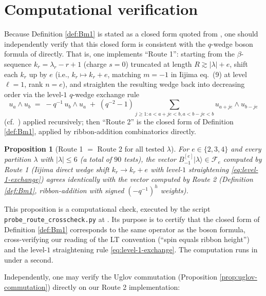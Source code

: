 \documentclass[11pt]{article}
\newtheorem{proposition}[theorem]{Proposition}
\theoremstyle{definition}
\newcommand{\Fock}{\mathcal{F}}
\newcommand{\Bmi}{B_{-1}^{[e]}}
\begin{document}
\section{Computational verification}
\label{sec:route-cross-check}

Because Definition \ref{def:Bm1} is stated as a closed form quoted from
\cite{LT96, Iij12}, one should independently verify that this closed form is
consistent with the $q$-wedge boson formula of \cite[eq.\ (9)]{Iij12} directly.
That is, one implements ``Route 1'': starting from the $\beta$-sequence
$k_r = \lambda_r - r + 1$ (charge $s = 0$) truncated at length
$R \gtrsim |\lambda| + e$, shift each $k_r$ up by $e$ (i.e., $k_r \mapsto k_r + e$,
matching $m = -1$ in Iijima eq.\ (9) at level $\ell = 1$, rank $n = e$), and
straighten the resulting wedge back into decreasing order via the level-$1$
$q$-wedge exchange rule
\begin{equation}
    u_a \wedge u_b \;=\; -q^{-1} \, u_b \wedge u_a \;+\; (q^{-2} - 1) \sum_{j \ge 1: a < a + j e < b, a < b - j e < b} u_{a + j e} \wedge u_{b - j e}
    \label{eq:level-1-exchange}
\end{equation}
(cf.\ \cite[Ex.\ 2.5, last line]{Iij12}) applied recursively; then ``Route 2''
is the closed form of Definition \ref{def:Bm1}, applied by ribbon-addition
combinatorics directly.

\begin{proposition}[Route 1 $=$ Route 2 for all tested $\lambda$]
\label{prop:routes-agree}
For $e \in \{2, 3, 4\}$ and every partition $\lambda$ with $|\lambda| \le 6$
(a total of $90$ tests), the vector $\Bmi |\lambda\rangle \in \Fock_e$ computed
by Route 1 (Iijima direct wedge shift $k_r \to k_r + e$ with level-$1$
straightening \eqref{eq:level-1-exchange}) agrees identically with the vector
computed by Route 2 (Definition \ref{def:Bm1}, ribbon-addition with signed
$(-q^{-1})^h$ weights).
\end{proposition}

This proposition is a computational check, executed by the script
\texttt{probe\_route\_crosscheck.py} at
. Its purpose is to certify that
the closed form of Definition \ref{def:Bm1} corresponds to the same operator as
the boson formula, cross-verifying our reading of the LT convention
(``spin equals ribbon height'') and the level-$1$ straightening rule
\eqref{eq:level-1-exchange}. The computation runs in under a second.

Independently, one may verify the Uglov commutation
(Proposition \ref{prop:uglov-commutation}) directly on our Route 2 implementation:
\end{document}
